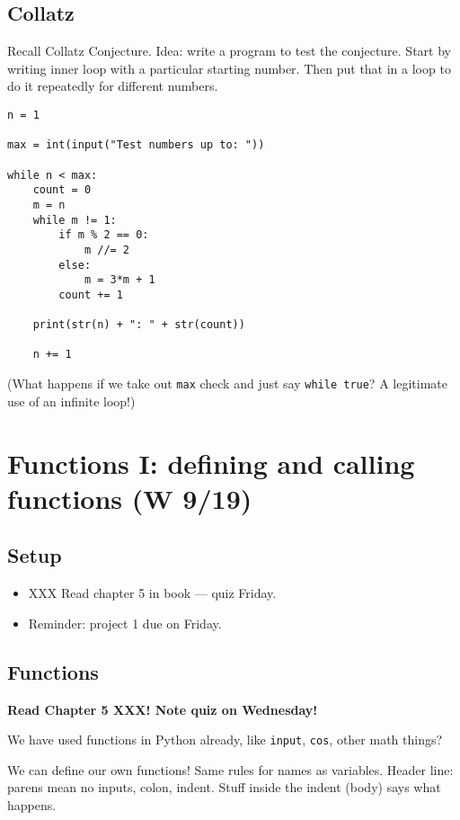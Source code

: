\documentclass{article}
\begin{document}
\subsection*{Collatz}

Recall Collatz Conjecture.  Idea: write a program to test the
conjecture.  Start by writing inner loop with a particular starting
number.  Then put that in a loop to do it repeatedly for different
numbers.

\begin{verbatim}
n = 1

max = int(input("Test numbers up to: "))

while n < max:
    count = 0
    m = n
    while m != 1:
        if m % 2 == 0:
            m //= 2
        else:
            m = 3*m + 1
        count += 1

    print(str(n) + ": " + str(count))

    n += 1
\end{verbatim}

(What happens if we take out \verb|max| check and just say
\verb|while true|?  A legitimate use of an infinite loop!)

\newpage
\section{Functions I: defining and calling functions (W 9/19)}

\subsection*{Setup}
\begin{itemize}
\item XXX Read chapter 5 in book --- quiz Friday.
\item Reminder: project 1 due on Friday.
\end{itemize}

\subsection*{Functions}

\textbf{Read Chapter 5 XXX! Note quiz on Wednesday!}

We have used functions in Python already, like \verb|input|,
\verb|cos|, other math things?

We can define our own functions!  Same rules for names as
variables. Header line: parens mean no inputs, colon, indent.  Stuff
inside the indent (body) says what happens.
\end{document}
